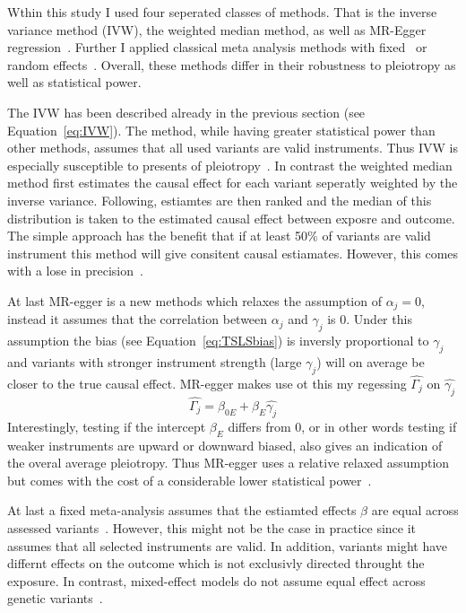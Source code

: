 Wthin this study I used four seperated classes of methods.
That is the inverse variance method (IVW), the weighted median method, as well as MR-Egger regression~\cite{Bowden2015}.
Further I applied classical meta analysis methods with fixed~\cite{Nelson2015a} or random effects~\cite{Ahmad2015a}.
Overall, these methods differ in their robustness to pleiotropy as well as statistical power.

The IVW has been described already in the previous section (see Equation~\ref{eq:IVW}).
The method, while having greater statistical power than other methods, assumes that all used variants are valid instruments.
Thus IVW is especially susceptible to presents of pleiotropy~\cite{Burgess2015b}.
In contrast the weighted median method first estimates the causal effect for each variant seperatly weighted by the inverse variance. 
Following, estiamtes are then ranked and the median of this distribution is taken to the estimated causal effect between exposre and outcome.
The simple approach has the benefit that if at least 50\% of variants are valid instrument this method will give consitent causal estiamates.
However, this comes with a lose in precision~\cite{Bowden2015}.

At last MR-egger is a new methods which relaxes the assumption of $\alpha_j=0$, instead it assumes that the correlation between $\alpha_j$ and $\gamma_j$ is $0$.
Under this assumption the bias (see Equation~\ref{eq:TSLSbias}) is inversly proportional to $\gamma_j$ and variants with stronger instrument strength (large $\gamma_j$) will on average be closer to the true causal effect.
MR-egger makes use ot this my regessing $\hat{\Gamma_j}$ on $\hat{\gamma_j}$
\begin{equation}\label{eq:egger}
  \hat{\Gamma_j} = \beta_{0E} + \beta_{E} \hat{\gamma_j}
\end{equation}
Interestingly, testing if the intercept $\beta_E$ differs from $0$, or in other words testing if weaker instruments are upward or downward biased, also gives an indication of the overal average pleiotropy.
Thus MR-egger uses a relative relaxed assumption but comes with the cost of a considerable lower statistical power~\cite{Bowden2015}.

At last a fixed meta-analysis assumes that the estiamted effects $\beta$ are equal across assessed variants~\cite{Burgess2015b}.
However, this might not be the case in practice since it assumes that all selected instruments are valid.
In addition, variants might have differnt effects on the outcome which is not exclusivly directed throught the exposure. 
In contrast, mixed-effect models do not assume equal effect across genetic variants~\cite{Burgess2015b}.

